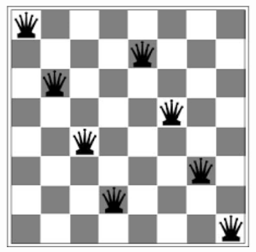 \documentclass[a4paper,12pt]{article}
\begin{document}
\bigskip

 \includegraphics[width=5.60417in,height=4.14583in]{queen-img001.png} 

\clearpage
\bigskip
\end{document}

